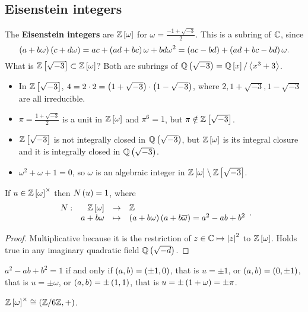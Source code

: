 \pagebreak

\subsection{Eisenstein integers}

The \textbf{Eisenstein integers} are $ \mathbb{Z}\left[ \omega \right] $ for $ \omega = \tfrac{-1 + \sqrt{-3}}{2} $. This is a subring of $ \mathbb{C} $, since
$$ \left( a + b\omega \right)\left( c + d\omega \right) = ac + \left( ad + bc \right)\omega + bd\omega^2 = \left( ac - bd \right) + \left( ad + bc - bd \right)\omega. $$
What is $ \mathbb{Z}\left[ \sqrt{-3} \right] \subset \mathbb{Z}\left[ \omega \right] $? Both are subrings of $ \mathbb{Q}\left( \sqrt{-3} \right) = \mathbb{Q}\left[ x \right] / \left\langle x^3 + 3 \right\rangle $.
\begin{itemize}
\item In $ \mathbb{Z}\left[ \sqrt{-3} \right] $, $ 4 = 2 \cdot 2 = \left( 1 + \sqrt{-3} \right) \cdot \left( 1 - \sqrt{-3} \right) $, where $ 2, 1 + \sqrt{-3}, 1 - \sqrt{-3} $ are all irreducible.
\item $ \pi = \tfrac{1 + \sqrt{-3}}{2} $ is a unit in $ \mathbb{Z}\left[ \omega \right] $ and $ \pi^6 = 1 $, but $ \pi \notin \mathbb{Z}\left[ \sqrt{-3} \right] $.
\item $ \mathbb{Z}\left[ \sqrt{-3} \right] $ is not integrally closed in $ \mathbb{Q}\left( \sqrt{-3} \right) $, but $ \mathbb{Z}\left[ \omega \right] $ is its integral closure and it is integrally closed in $ \mathbb{Q}\left( \sqrt{-3} \right) $.
\item $ \omega^2 + \omega + 1 = 0 $, so $ \omega $ is an algebraic integer in $ \mathbb{Z}\left[ \omega \right] \setminus \mathbb{Z}\left[ \sqrt{-3} \right] $.
\end{itemize}

\begin{proposition}
If $ u \in \mathbb{Z}\left[ \omega \right]^\times $ then $ N\left( u \right) = 1 $, where
$$ \function[N]{\Z\sb{\omega}}{\Z}{a + b\omega}{\rb{a + b\omega}\rb{a + b\overline{\omega}} = a^2 - ab + b^2}. $$
\end{proposition}

\begin{proof}
Multiplicative because it is the restriction of $ z \in \mathbb{C} \mapsto \left\lvert z \right\rvert^2 $ to $ \mathbb{Z}\left[ \omega \right] $. Holds true in any imaginary quadratic field $ \mathbb{Q}\left( \sqrt{-d} \right) $.
\end{proof}

$ a^2 - ab + b^2 = 1 $ if and only if $ \left( a, b \right) = \left( \pm 1, 0 \right) $, that is $ u = \pm 1 $, or $ \left( a, b \right) = \left( 0, \pm 1 \right) $, that is $ u = \pm \omega $, or $ \left( a, b \right) = \pm\left( 1, 1 \right) $, that is $ u = \pm\left( 1 + \omega \right) = \pm\pi $.

\begin{remark*}
$ \mathbb{Z}\left[ \omega \right]^\times \cong \left( \mathbb{Z} / 6\mathbb{Z}, + \right) $.
\end{remark*}

